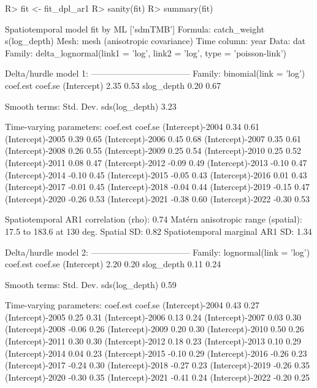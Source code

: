 \documentclass[article]{jss}\usepackage[]{graphicx}\usepackage[dvipsnames]{xcolor}
\begin{document}
\begin{Schunk}
\begin{Sinput}
R> fit <- fit_dpl_ar1
R> sanity(fit)
R> summary(fit)
\end{Sinput}
\begin{Soutput}
Spatiotemporal model fit by ML ['sdmTMB']
Formula: catch_weight ~ s(log_depth)
Mesh: mesh (anisotropic covariance)
Time column: year
Data: dat
Family: delta_lognormal(link1 = 'log', link2 = 'log', type = 'poisson-link')

Delta/hurdle model 1: -----------------------------------
Family: binomial(link = 'log') 
            coef.est coef.se
(Intercept)     2.35    0.53
slog_depth      0.20    0.67

Smooth terms:
               Std. Dev.
sds(log_depth)      3.23

Time-varying parameters:
                 coef.est coef.se
(Intercept)-2004     0.34    0.61
(Intercept)-2005     0.39    0.65
(Intercept)-2006     0.45    0.68
(Intercept)-2007     0.35    0.61
(Intercept)-2008     0.26    0.55
(Intercept)-2009     0.25    0.54
(Intercept)-2010     0.25    0.52
(Intercept)-2011     0.08    0.47
(Intercept)-2012    -0.09    0.49
(Intercept)-2013    -0.10    0.47
(Intercept)-2014    -0.10    0.45
(Intercept)-2015    -0.05    0.43
(Intercept)-2016     0.01    0.43
(Intercept)-2017    -0.01    0.45
(Intercept)-2018    -0.04    0.44
(Intercept)-2019    -0.15    0.47
(Intercept)-2020    -0.26    0.53
(Intercept)-2021    -0.38    0.60
(Intercept)-2022    -0.30    0.53

Spatiotemporal AR1 correlation (rho): 0.74
Matérn anisotropic range (spatial): 17.5 to 183.6 at 130 deg.
Spatial SD: 0.82
Spatiotemporal marginal AR1 SD: 1.34

Delta/hurdle model 2: -----------------------------------
Family: lognormal(link = 'log') 
            coef.est coef.se
(Intercept)     2.20    0.20
slog_depth      0.11    0.24

Smooth terms:
               Std. Dev.
sds(log_depth)      0.59

Time-varying parameters:
                 coef.est coef.se
(Intercept)-2004     0.43    0.27
(Intercept)-2005     0.25    0.31
(Intercept)-2006     0.13    0.24
(Intercept)-2007     0.03    0.30
(Intercept)-2008    -0.06    0.26
(Intercept)-2009     0.20    0.30
(Intercept)-2010     0.50    0.26
(Intercept)-2011     0.30    0.30
(Intercept)-2012     0.18    0.23
(Intercept)-2013     0.10    0.29
(Intercept)-2014     0.04    0.23
(Intercept)-2015    -0.10    0.29
(Intercept)-2016    -0.26    0.23
(Intercept)-2017    -0.24    0.30
(Intercept)-2018    -0.27    0.23
(Intercept)-2019    -0.26    0.35
(Intercept)-2020    -0.30    0.35
(Intercept)-2021    -0.41    0.24
(Intercept)-2022    -0.20    0.25


\end{Soutput}
\end{Schunk}
\end{document}
